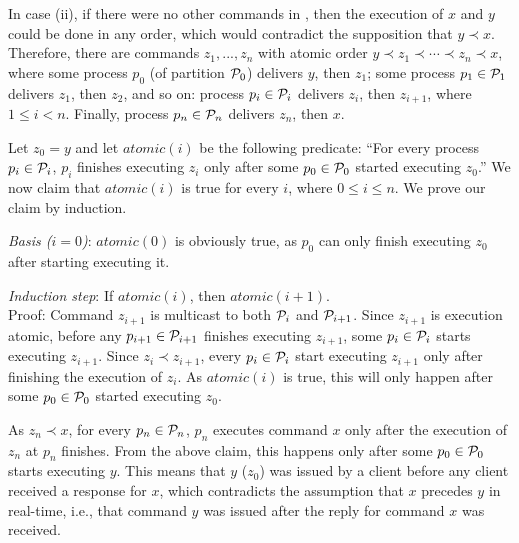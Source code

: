 In case (ii), if there were no other commands in \ex, then the execution of $x$
and $y$ could be done in any order, which would contradict the supposition that
$y \prec x$. Therefore, there are commands $z_1, ..., z_n$ with atomic order $y
\prec z_1 \prec \cdots \prec z_n \prec x$, where some process $p_0$ (of
partition $\mathcal{P}_0$) delivers $y$, then $z_1$; some process $p_1 \in \mathcal{P}_1$
delivers $z_1$, then $z_2$, and so on: process $p_i \in \mathcal{P}_i$ delivers
$z_{i}$, then $z_{i+1}$, where $1 \leq i < n$. Finally, process $p_n \in \mathcal{P}_n$
delivers $z_n$, then $x$.

Let $z_0 = y$ and let $atomic(i)$ be the following predicate: ``For every
process $p_i \in \mathcal{P}_i$, $p_i$ finishes executing $z_i$ only after some $p_0
\in \mathcal{P}_0$ started executing $z_0$.'' We now claim that $atomic(i)$ is true for
every $i$, where $0 \leq i \leq n$. We prove our claim by induction.


\emph{Basis ($i=0$)}: $atomic(0)$ is obviously true, as $p_0$ can only finish
executing $z_0$ after starting executing it.

\emph{Induction step}: If $atomic(i)$, then $atomic(i+1)$. \\
Proof: Command $z_{i+1}$ is multicast to both $\mathcal{P}_i$ and $\mathcal{P}_{i+1}$. Since
$z_{i+1}$ is execution atomic, before any $p_{i+1} \in \mathcal{P}_{i+1}$ finishes
executing $z_{i+1}$, some $p_i \in \mathcal{P}_i$ starts executing $z_{i+1}$. Since
$z_i \prec z_{i+1}$, every $p_i \in \mathcal{P}_i$ start executing $z_{i+1}$ only after
finishing the execution of $z_i$. As $atomic(i)$ is true, this will only happen
after some $p_0 \in \mathcal{P}_0$ started executing $z_0$.


As $z_n \prec x$, for every $p_n \in \mathcal{P}_n$, $p_n$ executes command $x$ only
after the execution of $z_n$ at $p_n$ finishes. From the above claim, this
happens only after some $p_0 \in \mathcal{P}_0$ starts executing $y$. This means that
$y$ ($z_0$) was issued by a client before any client received a response for
$x$, which contradicts the assumption that $x$ precedes $y$ in real-time, i.e.,
that command $y$ was issued after the reply for command $x$ was received.

